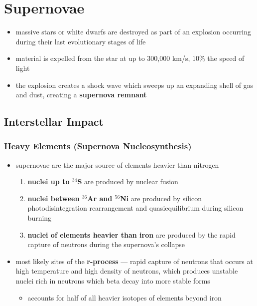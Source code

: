 \section{Supernovae}
\begin{itemize}[noitemsep]
	\item massive stars or white dwarfs are destroyed as part of an explosion occurring during their last evolutionary stages of life
	\item material is expelled from the star at up to 300,000 km/s, 10\% the speed of light
	\item the explosion creates a shock wave which sweeps up an expanding shell of gas and dust, creating a \textbf{supernova remnant}
\end{itemize}


\subsection{Interstellar Impact}
\subsubsection{Heavy Elements (Supernova Nucleosynthesis)}
\begin{itemize}[noitemsep]
	\item supernovae are the major source of elements heavier than nitrogen
		\begin{enumerate}
			\item \textbf{nuclei up to $^{34}$S} are produced by nuclear fusion
			\item \textbf{nuclei between $^{36}$Ar and $^{56}$Ni} are produced by silicon photodisintegration rearrangement and quasiequilibrium during silicon burning
			\item \textbf{nuclei of elements heavier than iron} are produced by the rapid capture of neutrons during the supernova's collapse
		\end{enumerate}
	\item most likely sites of the \textbf{r-process} --- rapid capture of neutrons that occurs at high temperature and high density of neutrons, which produces unstable nuclei rich in neutrons which beta decay into more stable forms
		\begin{itemize}[noitemsep]
			\item accounts for half of all heavier isotopes of elements beyond iron
		\end{itemize}
\end{itemize}

